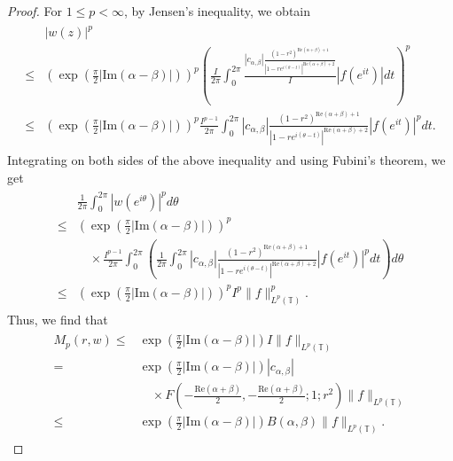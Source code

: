 \documentclass[11pt, reqno]{amsart}
\theoremstyle{definition}
\numberwithin{equation}{section}
\theoremstyle{remark}
\numberwithin{equation}{section}
\begin{document}
\begin{proof}
		\noindent For $1\leq p<\infty$, by Jensen's inequality, we obtain
		\begin{align*}
        \begin{split}
			&|w(z)|^p\\\leq&\left(\exp\left(\frac{\pi}{2}| \text{Im}(\alpha-\beta)|\right)\right)^p\left(\frac{I}{2\pi} \int_{0}^{2\pi}\frac{|c_{\alpha,\beta}|\frac{(1-r^2)^{\text{Re}(\alpha+\beta)+1}}{|1-re^{i(\theta-t)}|^{\text{Re}(\alpha+\beta)+2}}}{I}|f(e^{it})| dt\right)^p\\\leq&\left(\exp\left(\frac{\pi}{2}| \text{Im}(\alpha-\beta)|\right)\right)^p \frac{I^{p-1}}{2\pi}\int_{0}^{2\pi}|c_{\alpha,\beta}|\frac{(1-r^2)^{\text{Re}(\alpha+\beta)+1}}{|1-re^{i(\theta-t)}|^{\text{Re}(\alpha+\beta)+2}}|f(e^{it})|^p dt.
     \end{split}
		\end{align*}
Integrating on both sides of the above inequality and using Fubini's theorem, we get
		\begin{align*}
        \begin{split}
			&\frac{1}{2\pi}\int_0^{2\pi}|w(e^{i\theta})|^p d\theta\\\leq & \left(\exp\left(\frac{\pi}{2}| \text{Im}(\alpha-\beta)|\right)\right)^p\\&\quad\times\frac{I^{p-1}}{2\pi}\int_{0}^{2\pi}\left(\frac{1}{2\pi}\int_{0}^{2\pi}|c_{\alpha,\beta}|\frac{(1-r^2)^{\text{Re}(\alpha+\beta)+1}}{|1-re^{i(\theta-t)}|^{\text{Re}(\alpha+\beta)+2}}|f(e^{it})|^p dt \right)d\theta\\\leq& \left(\exp\left(\frac{\pi}{2}| \text{Im}(\alpha-\beta)|\right)\right)^pI^p\|f\|^p_{L^p(\mathbb{T})}.
            \end{split}
		\end{align*}
		Thus, we find that
		\begin{align*}
        \begin{split}
			 M_p(r,w)\leq& \exp\left(\frac{\pi}{2}|\text{Im}(\alpha-\beta)|\right)I\|f\|_{L^p(\mathbb{T})}\\=&\exp\left(\frac{\pi}{2}| \text{Im}(\alpha-\beta)|\right)|c_{\alpha,\beta}|\\&\quad\times F\left(-\frac{\mbox{Re}(\alpha+\beta)}{2},-\frac{\mbox{Re}(\alpha+\beta)}{2};1;r^2\right)\|f\|_{L^p(\mathbb{T})}\\\leq& \exp\left(\frac{\pi}{2}| \text{Im}(\alpha-\beta)|\right)B(\alpha,\beta)\|f\|_{L^p(\mathbb{T})}.     
        \end{split}
		\end{align*}
        

\end{proof}
\end{document}
